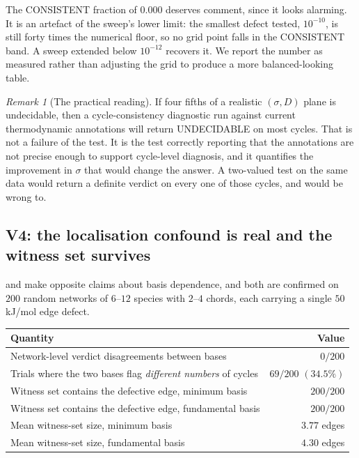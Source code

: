 \documentclass[11pt,twocolumn,a4paper]{article}
\theoremstyle{pstyle}
\theoremstyle{definition}
\theoremstyle{remark}
\newtheorem{remark}[theorem]{Remark}
\begin{document}
The \textsf{CONSISTENT} fraction of $0.000$ deserves comment, since it
looks alarming. It is an artefact of the sweep's lower limit: the
smallest defect tested, $10^{-10}$, is still forty times the numerical
floor, so no grid point falls in the \textsf{CONSISTENT} band. A sweep
extended below $10^{-12}$ recovers it. We report the number as measured
rather than adjusting the grid to produce a more balanced-looking table.

\begin{remark}[The practical reading]
\label{rem:v3-reading}
If four fifths of a realistic $(\sigma,D)$ plane is undecidable, then a
cycle-consistency diagnostic run against current thermodynamic
annotations will return \textsf{UNDECIDABLE} on most cycles. That is not
a failure of the test. It is the test correctly reporting that the
annotations are not precise enough to support cycle-level diagnosis, and
it quantifies the improvement in $\sigma$ that would change the answer.
A two-valued test on the same data would return a definite verdict on
every one of those cycles, and would be wrong to.
\end{remark}

\subsection{V4: the localisation confound is real and the witness set survives}

 and  make
opposite claims about basis dependence, and both are confirmed on $200$
random networks of $6$--$12$ species with $2$--$4$ chords, each carrying
a single $50$ kJ/mol edge defect.

\begin{center}\small
\begin{tabular}{@{}lr@{}}
\toprule
Quantity & Value\\
\midrule
Network-level verdict disagreements between bases & $0/200$\\
Trials where the two bases flag \emph{different numbers} of cycles &
$69/200$ $(34.5\%)$\\
Witness set contains the defective edge, minimum basis & $200/200$\\
Witness set contains the defective edge, fundamental basis & $200/200$\\
Mean witness-set size, minimum basis & $3.77$ edges\\
Mean witness-set size, fundamental basis & $4.30$ edges\\
\bottomrule
\end{tabular}
\end{center}
\end{document}
